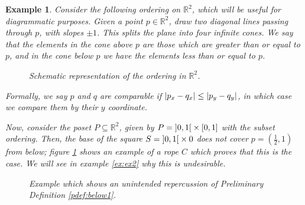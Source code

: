 \documentclass{article}
\newtheorem{example}[theorem]{Example}
\theoremstyle{nonumberplain}
\newcommand{\R}{\mathbb{R}}
\DeclarePairedDelimiter{\abs}{\lvert}{\rvert}
\begin{document}
\begin{example}\label{ex:ex1}
Consider the following ordering on $\R^2$, which will be useful for diagrammatic purposes. Given a point $p \in \R^2$, draw two diagonal lines passing through $p$, with slopes $\pm 1$. This splits the plane into four infinite cones. We say that the elements in the cone above $p$ are those which are greater than or equal to $p$, and in the cone below $p$ we have the elements less than or equal to $p$.
\begin{figure}[H]
\centering
{}
\caption{Schematic representation of the ordering in $\R^2$.}
\end{figure}

Formally, we say $p$ and $q$ are comparable if $\abs{p_x - q_x} \leq \abs{p_y - q_y}$, in which case we compare them by their $y$ coordinate.

Now, consider the poset $P \subseteq \R^2$, given by $P = \ointerval01 \times \interval01$ with the subset ordering. Then, the base of the square $S = \ointerval01 \times 0$ does not cover $p = (\frac12, 1)$ from below; figure \ref{fig:ex1} shows an example of a rope $C$ which proves that this is the case. We will see in example \ref{ex:ex2} why this is undesirable.
\begin{figure}[H]
\centering
{}
\caption{Example which shows an unintended repercussion of Preliminary Definition \ref{pdef:below1}.}\label{fig:ex1}
\end{figure}
\end{example}
\end{document}

